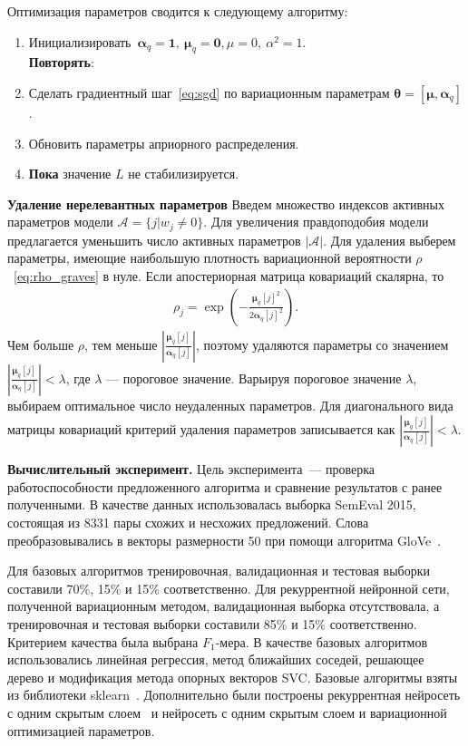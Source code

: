 Оптимизация параметров сводится к следующему алгоритму:\\
\begin{enumerate}
\item Инициализировать~$\boldsymbol{\alpha}_q = \textbf{1}, \ \boldsymbol{\mu}_q = \textbf{0}, {\mu} = 0, \ \alpha^2 = 1$.\\
{\textbf{Повторять}}:\\
\item Сделать градиентный шаг~\eqref{eq:sgd} по вариационным параметрам $\boldsymbol{\theta} = [\boldsymbol{\mu}, \boldsymbol{\alpha}_q]$.
\item Обновить параметры априорного распределения.\\
\item {\textbf{Пока}} значение $L$ не стабилизируется.
\end{enumerate}

\textbf{Удаление нерелевантных параметров}
Введем множество индексов активных параметров модели $\mathcal{A} = \{j | w_j \neq 0\} $. Для увеличения правдоподобия модели предлагается уменьшить число активных параметров $|\mathcal{A}|$. Для удаления выберем параметры, имеющие наибольшую плотность вариационной вероятности $\rho$~\eqref{eq:rho_graves} в нуле.
Если апостериорная матрица ковариаций скалярна, то  
\begin{gather}
\rho_j = \exp\left(-\frac{\boldsymbol{\mu}_{q}[j]^2}{2\boldsymbol{\alpha}_{q}[j]^2}\right).
\end{gather}
Чем больше $\rho$, тем меньше $|\frac{\boldsymbol{\mu}_{q}[j]}{\boldsymbol{\alpha}_{q}[j]}|$, поэтому удаляются параметры со значением $|\frac{\boldsymbol{\mu}_{q}[j]}{\boldsymbol{\alpha}_{q}[j]}| < \lambda$, где $\lambda$ --- пороговое значение. Варьируя пороговое значение $\lambda$, выбираем оптимальное число неудаленных параметров.
Для диагонального вида матрицы ковариаций критерий удаления параметров записывается как $|\frac{\boldsymbol{\mu}_{q}[j]}{\boldsymbol{\alpha}_{q}[j]}| < \lambda$.

\textbf{Вычислительный эксперимент. }
Цель эксперимента~--- проверка работоспособности предложенного алгоритма и сравнение результатов с ранее полученными. В качестве данных использовалась выборка SemEval 2015, состоящая из 8331 пары схожих и несхожих предложений. Слова преобразовывались в векторы размерности 50 при помощи алгоритма GloVe~\cite{glove}.

Для базовых алгоритмов тренировочная, валидационная и тестовая выборки составили 70\%, 15\% и 15\% соответственно.
Для рекуррентной нейронной сети, полученной вариационным методом, валидационная выборка отсутствовала, а тренировочная и тестовая выборки составили 85\% и 15\% соответственно.
Критерием качества была выбрана $F_1$-мера.
В качестве базовых алгоритмов использовались линейная регрессия, метод ближайших соседей, решающее дерево и модификация метода опорных векторов SVC. Базовые алгоритмы взяты из библиотеки sklearn~\cite{sklearn}. 
Дополнительно были построены рекуррентная нейросеть с одним скрытым слоем~\cite{sanborn} и нейросеть с одним скрытым слоем и вариационной оптимизацией параметров.


